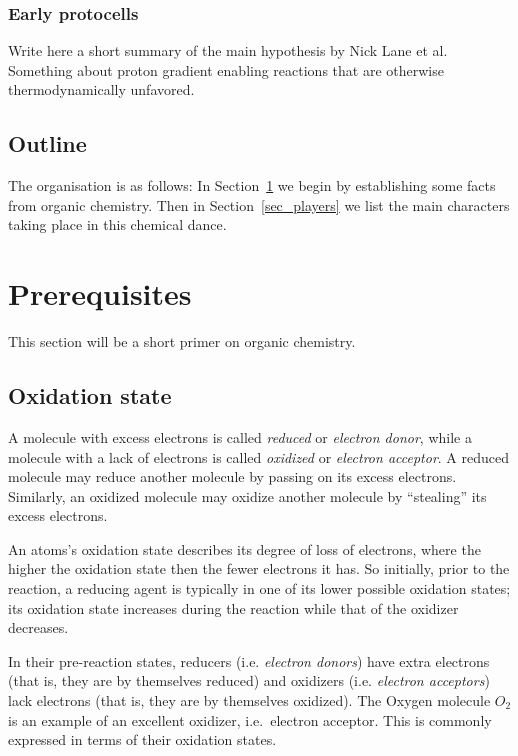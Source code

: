 \documentclass[a4paper,14pt]{extarticle}
\begin{document}
\subsubsection{Early protocells}
Write here a short summary of the main hypothesis by Nick Lane et al. Something about
proton gradient enabling reactions that are otherwise thermodynamically unfavored.

\subsection{Outline}

The organisation is as follows: In Section~\ref{sec_prerequisites} we begin by
establishing some facts from organic chemistry. Then in Section~\ref{sec_players}
we list the main characters taking place in this chemical dance.


\pagebreak
\section{Prerequisites}\label{sec_prerequisites}

This section will be a short primer on organic chemistry.

\subsection{Oxidation state}\label{sec_oxidation_states}

A molecule with excess electrons is called {\em reduced\/} or {\em electron donor}, while
a molecule with a lack of electrons is called {\em oxidized\/} or {\em electron acceptor}.
A reduced molecule may reduce another molecule by passing on its excess electrons.
Similarly, an oxidized molecule may oxidize another molecule by ``stealing'' its excess
electrons.

An atoms's oxidation state describes its degree of loss
of electrons, where the higher the oxidation state then the fewer electrons it has.
So initially, prior to the reaction, a reducing agent is typically in one of its lower
possible oxidation states; its oxidation state increases during the reaction while that of
the oxidizer decreases.

In their pre-reaction states, reducers (i.e. {\em electron donors\/}) have extra electrons
(that is, they are by themselves reduced) and oxidizers (i.e. {\em electron acceptors\/})
lack electrons (that is, they are by themselves oxidized). The Oxygen molecule $O_2$ is an
example of an excellent oxidizer, i.e.\ electron acceptor. This is commonly expressed in
terms of their oxidation states.
\end{document}
